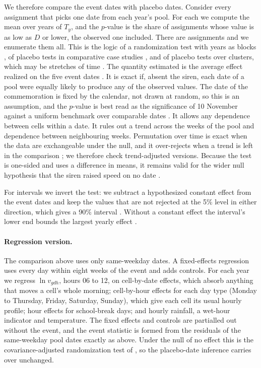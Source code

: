 \documentclass[11pt,a4paper]{article}
\begin{document}
We therefore compare the event dates with placebo dates. Consider every assignment that picks one
date from each year's pool. For each we compute the mean over years of $T_y$, and the $p$-value is
the share of assignments whose value is as low as $D$ or lower, the observed one included. There are
\nAssign{} assignments and we enumerate them all. This is the logic of a randomization test with
years as blocks \citep{rosenbaum2002book,ernst2004,hess2017,athey2017}, of placebo tests in
comparative case studies \citep{abadie2010,abadie2015,firpo2018}, and of placebo tests over clusters,
which may be stretches of time \citep{hagemann2019}. The quantity estimated is the average effect
realized on the five event dates \citep{alvarez2023}. It is exact if, absent the siren, each date
of a pool were equally likely to produce any of the observed values. The date of the commemoration
is fixed by the calendar, not drawn at random, so this is an assumption, and the $p$-value is best
read as the significance of 10 November against a uniform benchmark over comparable dates
\citep{abadie2021,mackinnon2020}. It allows any dependence between cells within a date. It rules out
a trend across the weeks of the pool and dependence between neighbouring weeks. Permutation over
time is exact when the data are exchangeable under the null, and it over-rejects when a trend is left
in the comparison \citep{chernozhukov2021,roth2023}; we therefore check trend-adjusted versions.
Because the test is one-sided and uses a difference in means, it remains valid for the wider null
hypothesis that the siren raised speed on no date \citep{caughey2023}.

For intervals we invert the test: we subtract a hypothesized constant effect from the event dates
and keep the values that are not rejected at the 5\% level in either direction, which gives a 90\%
interval \citep{rosenbaum2002book,rosenbaum2002}. Without a constant effect the interval's lower end
bounds the largest yearly effect \citep{caughey2023}.

\paragraph{Regression version.} The comparison above uses only same-weekday dates. A fixed-effects
regression uses every day within eight weeks of the event and adds controls. For each year we
regress $\ln v_{gdh}$, hours 06 to 12, on cell-by-date effects, which absorb anything that moves a
cell's whole morning; cell-by-hour effects for each day type (Monday to Thursday, Friday, Saturday,
Sunday), which give each cell its usual hourly profile; hour effects for school-break days; and
hourly rainfall, a wet-hour indicator and temperature. The fixed effects and controls are partialled
out without the event, and the event statistic is formed from the residuals of the same-weekday pool
dates exactly as above. Under the null of no effect this is the covariance-adjusted randomization
test of \citet{rosenbaum2002}, so the placebo-date inference carries over unchanged.
\end{document}
